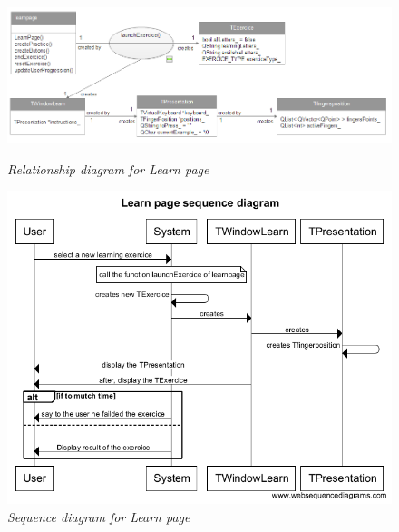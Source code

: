 \begin{figure}[h]
\begin{center}
\begin{minipage}{0.2\linewidth}
      \centering \includegraphics[height=1\textwidth]{images/Rlearnpage.png}
      \caption{\it Relationship diagram for Learn page}   
\end{minipage}
\begin{minipage}{0.2\linewidth}
      \centering \includegraphics[height=1\textwidth]{images/Slearnpage.png}
      \caption{\it Sequence diagram for Learn page}
\end{minipage}
\end{center}
\end{figure}

